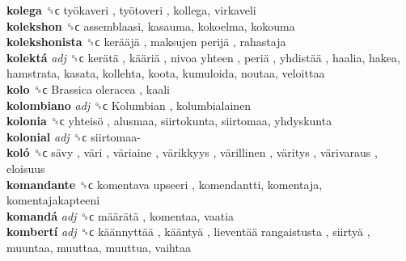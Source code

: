 \textbf{kolega} ␝ϲ   työkaveri ,  työtoveri , kollega, virkaveli  \\
\textbf{kolekshon} ␝ϲ  assemblaasi, kasauma, kokoelma, kokouma  \\
\textbf{kolekshonista} ␝ϲ   kerääjä ,  maksujen perijä , rahastaja  \\
\textbf{kolektá} \emph{adj}  ␝ϲ   kerätä ,  kääriä ,  nivoa yhteen ,  periä ,  yhdistää , haalia, hakea, hamstrata, kasata, kollehta, koota, kumuloida, noutaa, veloittaa  \\
\textbf{kolo} ␝ϲ   Brassica oleracea , kaali  \\
\textbf{kolombiano} \emph{adj}  ␝ϲ   Kolumbian , kolumbialainen  \\
\textbf{kolonia} ␝ϲ   yhteisö , alusmaa, siirtokunta, siirtomaa, yhdyskunta  \\
\textbf{kolonial} \emph{adj}  ␝ϲ   siirtomaa-   \\
\textbf{koló} ␝ϲ   sävy ,  väri ,  väriaine ,  värikkyys ,  värillinen ,  väritys ,  värivaraus , eloisuus  \\
\textbf{komandante} ␝ϲ   komentava upseeri , komendantti, komentaja, komentajakapteeni  \\
\textbf{komandá} \emph{adj}  ␝ϲ   määrätä , komentaa, vaatia  \\
\textbf{kombertí} \emph{adj}  ␝ϲ   käännyttää ,  kääntyä ,  lieventää rangaistusta ,  siirtyä , muuntaa, muuttaa, muuttua, vaihtaa  \\
